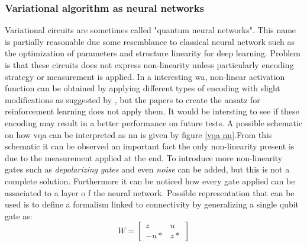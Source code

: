 \subsubsection{Variational algorithm as neural networks}
Variational circuits are sometimes called "quantum neural networks". This name is partially reasonable due some resemblance to classical neural network such as the optimization of parameters and structure linearity for deep learning. Problem is that these circuits does not express non-linearity unless particularly encoding strategy or measurement is applied. 
In a interesting wa, non-linear activation function can be obtained by applying different types of encoding with slight modifications as suggested by \cite{Schuld2021vqa}, but the papers to create the ansatz for reinforcement learning does not apply them. It would be intersting to see if these encoding may result in a better performance on future tests.
A possible schematic on how \acrlong{vqa} can be interpreted as \acrlong{nn} is given by figure \ref{vqa nn}.From this schematic it can be observed an important fact the only non-linearity present is due to the measurement applied at the end. To introduce more non-linearity gates such as \textit{depolarizing gates} and even \textit{noise} can be added, but this is not a complete solution. Furthermore it can be noticed how every gate applied can be associated to a layer o f the neural network.
Possible representation that can be used is to define a formalism linked to connectivity by generalizing a single qubit gate as:
\begin{equation*}
	W = \begin{bmatrix}
		z & u \\
		-u* & z*
	\end{bmatrix}
\end{equation*}

